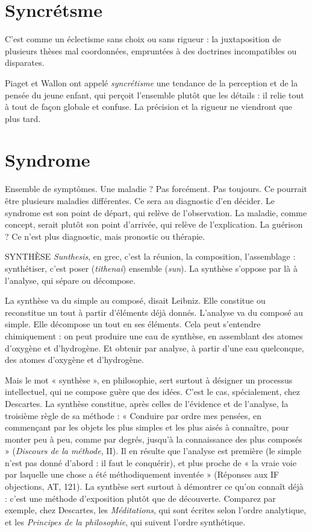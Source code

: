 \section{Syncrétsme}
C’est comme un éclectisme sans choix ou sans rigueur : la
juxtaposition de plusieurs thèses mal coordonnées, empruntées
à des doctrines incompatibles ou disparates.

Piaget et Wallon ont appelé {\it syncrétisme} une tendance de la perception et de
la pensée du jeune enfant, qui perçoit l’ensemble plutôt que les détails : il relie
tout à tout de façon globale et confuse. La précision et la rigueur ne viendront
que plus tard.

\section{Syndrome}
Ensemble de symptômes. Une maladie ? Pas forcément. Pas toujours.
Ce pourrait être plusieurs maladies différentes. Ce sera
au diagnostic d’en décider. Le syndrome est son point de départ, qui relève de
l'observation. La maladie, comme concept, serait plutôt son point d’arrivée,
qui relève de l'explication. La guérison ? Ce n’est plus diagnostic, mais pronostic
ou thérapie.

SYNTHÈSE {\it Sunthesis}, en grec, c’est la réunion, la composition, l’assemblage :
synthétiser, c’est poser ({\it tithenai}) ensemble ({\it sun}). La synthèse
s’oppose par là à l'analyse, qui sépare ou décompose.

La synthèse va du simple au composé, disait Leibniz. Elle constitue ou
reconstitue un tout à partir d'éléments déjà donnés. L'analyse va du composé
au simple. Elle décompose un tout en ses éléments. Cela peut s'entendre
chimiquement : on peut produire une eau de synthèse, en assemblant des
atomes d’oxygène et d'hydrogène. Et obtenir par analyse, à partir d’une eau
quelconque, des atomes d'oxygène et d'hydrogène.

Mais le mot « synthèse », en philosophie, sert surtout à désigner un processus
intellectuel, qui ne compose guère que des idées. C’est le cas, spécialement,
chez Descartes. La synthèse constitue, après celles de l'évidence et de
l'analyse, la troisième règle de sa méthode : « Conduire par ordre mes pensées,
en commençant par les objets les plus simples et les plus aisés à connaître, pour
monter peu à peu, comme par degrés, jusqu'à la connaissance des plus
composés » ({\it Discours de la méthode}, II). Il en résulte que l’analyse est première
(le simple n’est pas donné d’abord : il faut le conquérir), et plus proche de « la
vraie voie par laquelle une chose a été méthodiquement inventée » (Réponses
aux IF objections, AT, 121). La synthèse sert surtout à démontrer ce qu’on
connaît déjà : c’est une méthode d’exposition plutôt que de découverte. Comparez
par exemple, chez Descartes, les {\it Méditations}, qui sont écrites selon l’ordre
analytique, et les {\it Principes de la philosophie}, qui suivent l’ordre synthétique.


